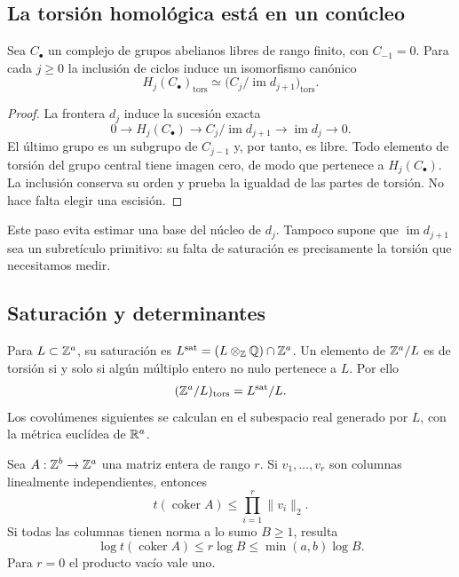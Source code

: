 \subsection{La torsión homológica está en un conúcleo}

\begin{lema}
\label{lem:ti-conucleo}
Sea $C_\bullet$ un complejo de grupos abelianos libres de rango
finito, con $C_{-1}=0$. Para cada $j\ge0$ la inclusión de ciclos
induce un isomorfismo canónico
\begin{equation}
 H_j(C_\bullet)_{\mathrm{tors}}
 \simeq
 \bigl(C_j/\operatorname{im}d_{j+1}\bigr)_{\mathrm{tors}}.
 \label{eq:ti-conucleo}
\end{equation}
\end{lema}

\begin{proof}
La frontera $d_j$ induce la sucesión exacta
\[
 0\longrightarrow H_j(C_\bullet)
 \longrightarrow C_j/\operatorname{im}d_{j+1}
 \longrightarrow\operatorname{im}d_j\longrightarrow0.
\]
El último grupo es un subgrupo de $C_{j-1}$ y, por tanto, es
libre. Todo elemento de torsión del grupo central tiene imagen
cero, de modo que pertenece a $H_j(C_\bullet)$. La inclusión
conserva su orden y prueba la igualdad de las partes de torsión.
No hace falta elegir una escisión.
\end{proof}

Este paso evita estimar una base del núcleo de $d_j$.
Tampoco supone que $\operatorname{im}d_{j+1}$ sea un subretículo
primitivo: su falta de saturación es precisamente la torsión
que necesitamos medir.

\subsection{Saturación y determinantes}

Para $L\subset\mathbb{Z}^a$, su saturación es
$L^{\mathrm{sat}}=(L\otimes_{\mathbb{Z}}\mathbb{Q})\cap\mathbb{Z}^a$.
Un elemento de $\mathbb{Z}^a/L$ es de torsión si y solo si algún
múltiplo entero no nulo pertenece a $L$. Por ello
\[
 (\mathbb{Z}^a/L)_{\mathrm{tors}}=L^{\mathrm{sat}}/L.
\]
Los covolúmenes siguientes se calculan en el subespacio real
generado por $L$, con la métrica euclídea de $\mathbb{R}^a$.

\begin{proposicion}
\label{prop:ti-gabber}
Sea $A:\mathbb{Z}^b\to\mathbb{Z}^a$ una matriz entera de rango $r$.
Si $v_1,\ldots,v_r$ son columnas linealmente independientes,
entonces
\begin{equation}
 t(\operatorname{coker}A)
 \le\prod_{i=1}^r\|v_i\|_2.
 \label{eq:ti-gabber}
\end{equation}
Si todas las columnas tienen norma a lo sumo $B\ge1$, resulta
\begin{equation}
 \log t(\operatorname{coker}A)
 \le r\log B\le\min(a,b)\log B.
 \label{eq:ti-gabber-log}
\end{equation}
Para $r=0$ el producto vacío vale uno.
\end{proposicion}

